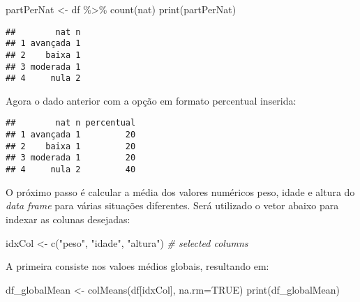 \documentclass[
]{article}
\newenvironment{Shaded}{\begin{snugshade}}{\end{snugshade}}
\newcommand{\AttributeTok}[1]{\textcolor[rgb]{0.77,0.63,0.00}{#1}}
\newcommand{\CommentTok}[1]{\textcolor[rgb]{0.56,0.35,0.01}{\textit{#1}}}
\newcommand{\ConstantTok}[1]{\textcolor[rgb]{0.00,0.00,0.00}{#1}}
\newcommand{\DecValTok}[1]{\textcolor[rgb]{0.00,0.00,0.81}{#1}}
\newcommand{\FunctionTok}[1]{\textcolor[rgb]{0.00,0.00,0.00}{#1}}
\newcommand{\NormalTok}[1]{#1}
\newcommand{\OtherTok}[1]{\textcolor[rgb]{0.56,0.35,0.01}{#1}}
\newcommand{\SpecialCharTok}[1]{\textcolor[rgb]{0.00,0.00,0.00}{#1}}
\newcommand{\StringTok}[1]{\textcolor[rgb]{0.31,0.60,0.02}{#1}}
\begin{document}
\begin{Shaded}
\begin{Highlighting}[]
\NormalTok{partPerNat }\OtherTok{\textless{}{-}}\NormalTok{ df }\SpecialCharTok{\%\textgreater{}\%} \FunctionTok{count}\NormalTok{(nat)}
\FunctionTok{print}\NormalTok{(partPerNat)}
\end{Highlighting}
\end{Shaded}

\begin{verbatim}
##        nat n
## 1 avançada 1
## 2    baixa 1
## 3 moderada 1
## 4     nula 2
\end{verbatim}

Agora o dado anterior com a opção em formato percentual inserida:

\begin{Shaded}
\end{Shaded}

\begin{verbatim}
##        nat n percentual
## 1 avançada 1         20
## 2    baixa 1         20
## 3 moderada 1         20
## 4     nula 2         40
\end{verbatim}

O próximo passo é calcular a média dos valores numéricos peso, idade e
altura do \emph{data frame} para várias situações diferentes. Será
utilizado o vetor abaixo para indexar as colunas desejadas:

\begin{Shaded}
\begin{Highlighting}[]
\NormalTok{idxCol }\OtherTok{\textless{}{-}} \FunctionTok{c}\NormalTok{(}\StringTok{"peso"}\NormalTok{, }\StringTok{"idade"}\NormalTok{, }\StringTok{"altura"}\NormalTok{) }\CommentTok{\# selected columns}
\end{Highlighting}
\end{Shaded}

A primeira consiste nos valoes médios globais, resultando em:

\begin{Shaded}
\begin{Highlighting}[]
\NormalTok{df\_globalMean }\OtherTok{\textless{}{-}} \FunctionTok{colMeans}\NormalTok{(df[idxCol], }\AttributeTok{na.rm=}\ConstantTok{TRUE}\NormalTok{)}
\FunctionTok{print}\NormalTok{(df\_globalMean)}
\end{Highlighting}
\end{Shaded}
\end{document}
